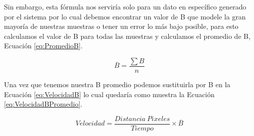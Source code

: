 Sin embargo, esta fórmula nos serviría solo para un dato en específico generado por el sistema por lo cual debemos encontrar un valor de B que modele la gran mayoría de nuestras muestras o tener un error lo más bajo posible, para esto calculamos el valor de B para todas las muestras y calculamos el promedio de B, Ecuación \ref{eq:PromedioB}.

\begin{equation}
    \label{eq:PromedioB}
    \overline{B} = \frac{\sum B}{n}
\end{equation}

Una vez que tenemos nuestra B promedio podemos sustituirla por B en la Ecuación \ref{eq:VelocidadB} lo cual quedaría como muestra la Ecuación \ref{eq:VelocidadBPromedio}.

\begin{equation}
    \label{eq:VelocidadBPromedio}
    Velocidad = \frac{Distancia \: Pixeles}{Tiempo} \times \overline{B}
\end{equation}




